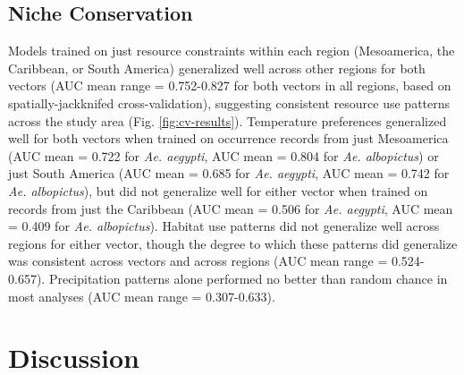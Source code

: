 \subsection{Niche Conservation}

Models trained on just resource constraints within each region (Mesoamerica, the Caribbean, or South America) generalized well across other regions for both vectors (AUC mean range = 0.752-0.827 for both vectors in all regions, based on spatially-jackknifed cross-validation), suggesting consistent resource use patterns across the study area (Fig. \ref{fig:cv-results}). Temperature preferences generalized well for both vectors when trained on occurrence records from just Mesoamerica (AUC mean = 0.722 for \textit{Ae. aegypti}, AUC mean = 0.804 for \textit{Ae. albopictus}) or just South America (AUC mean = 0.685 for \textit{Ae. aegypti}, AUC mean = 0.742 for \textit{Ae. albopictus}), but did not generalize well for either vector when trained on records from just the Caribbean (AUC mean = 0.506 for \textit{Ae. aegypti}, AUC mean = 0.409 for \textit{Ae. albopictus}). Habitat use patterns did not generalize well across regions for either vector, though the degree to which these patterns did generalize was consistent across vectors and across regions (AUC mean range = 0.524-0.657). Precipitation patterns alone performed no better than random chance in most analyses (AUC mean range = 0.307-0.633).

\section{Discussion}

